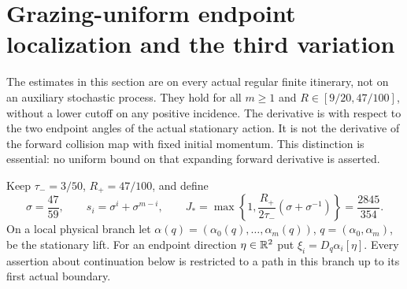 \section{Grazing-uniform endpoint localization and the third variation}
\label{sec:el-localization}
The estimates in this section are on every actual regular finite itinerary,
not on an auxiliary stochastic process. They hold for all $m\geq1$ and
$R\in[9/20,47/100]$, without a lower cutoff on any positive incidence.
The derivative is with respect to the two endpoint angles of the actual
stationary action. It is not the derivative of the forward collision map
with fixed initial momentum. This distinction is essential: no uniform
bound on that expanding forward derivative is asserted.

Keep $\tau_-=3/50$, $R_+=47/100$, and define
\begin{equation}\label{eq:el-constants}
 \sigma=\frac{47}{59},\qquad
 s_i=\sigma^i+\sigma^{m-i},\qquad
 J_* =\max\left\{1,\frac{R_+}{2\tau_-}(\sigma+\sigma^{-1})\right\}
       =\frac{2845}{354}.
\end{equation}
On a local physical branch let
$\alpha(q)=(\alpha_0(q),\ldots,\alpha_m(q))$, $q=(\alpha_0,\alpha_m)$,
be the stationary lift. For an endpoint direction $\eta\in\mathbb R^2$ put
$\xi_i=D_q\alpha_i[\eta]$. Every assertion about continuation below is
restricted to a path in this branch up to its first actual boundary.

